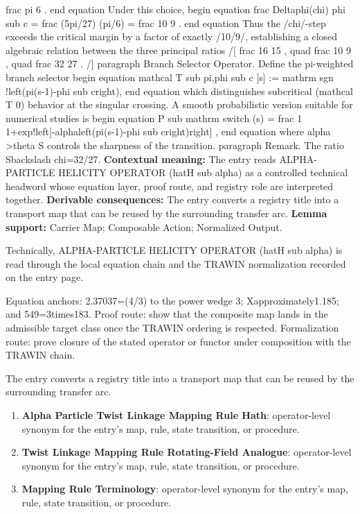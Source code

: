 frac pi 6 . end equation Under this choice, begin equation frac Deltaphi(chi) phi sub c = frac (5pi/27) (pi/6) = frac 10 9 . end equation Thus the /chi/-step exceeds the critical margin by a factor of exactly /10/9/, establishing a closed algebraic relation between the three principal ratios /[ frac 16 15 , quad frac 10 9 , quad frac 32 27 . /] paragraph Branch Selector Operator. Define the pi-weighted branch selector begin equation mathcal T sub pi,phi sub c [s] := mathrm sgn !left(pi(s-1)-phi sub cright), end equation which distinguishes subcritical (mathcal T 0) behavior at the singular crossing. A smooth probabilistic version suitable for numerical studies is begin equation P sub mathrm switch (s) = frac 1 1+exp!left[-alphaleft(pi(s-1)-phi sub cright)right] , end equation where alpha >theta S controls the sharpness of the transition. paragraph Remark. The ratio Sbackslash chi=32/27. \textbf{Contextual meaning:} The entry reads ALPHA-PARTICLE HELICITY OPERATOR (hatH sub alpha) as a controlled technical headword whose equation layer, proof route, and registry role are interpreted together. \textbf{Derivable consequences:} The entry converts a registry title into a transport map that can be reused by the surrounding transfer arc. \textbf{Lemma support:} Carrier Map; Composable Action; Normalized Output.\par
\endgroup

Technically, ALPHA-PARTICLE HELICITY OPERATOR (hatH sub alpha) is read through the local equation chain and the TRAWIN normalization recorded on the entry page.

Equation anchors: 2.37037=(4/3) to the power wedge 3; Xapproximately1.185; and 549=3times183. Proof route: show that the composite map lands in the admissible target class once the TRAWIN ordering is respected. Formalization route: prove closure of the stated operator or functor under composition with the TRAWIN chain.

The entry converts a registry title into a transport map that can be reused by the surrounding transfer arc.
\endgroup

\begin{enumerate}[leftmargin=1.6em,itemsep=6pt,topsep=4pt]
\item \textbf{Alpha Particle Twist Linkage Mapping Rule Hath}: operator-level synonym for the entry's map, rule, state transition, or procedure.
\item \textbf{Twist Linkage Mapping Rule Rotating-Field Analogue}: operator-level synonym for the entry's map, rule, state transition, or procedure.
\item \textbf{Mapping Rule Terminology}: operator-level synonym for the entry's map, rule, state transition, or procedure.
\end{enumerate}

